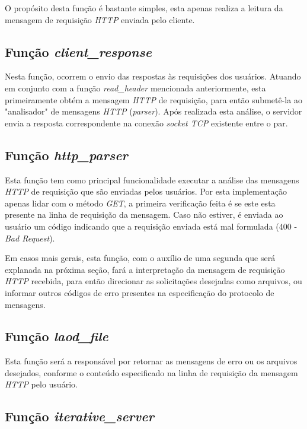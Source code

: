 \documentclass[a4paper, 12pt]{article}
\begin{document}
O propósito desta função é bastante simples, esta apenas realiza a leitura da mensagem de requisição \emph{HTTP} enviada pelo cliente.

\subsection{Função \emph{client\_response}}

Nesta função, ocorrem o envio das respostas às requisições dos usuários. Atuando em conjunto com a função \emph{read\_header} mencionada anteriormente, esta primeiramente obtém a mensagem \emph{HTTP} de requisição, para então submetê-la ao "analisador" de mensagens \emph{HTTP} (\emph{parser}). Após realizada esta análise, o servidor envia a resposta correspondente na conexão \emph{socket TCP} existente entre o par. 

\subsection{Função \emph{http\_parser}}

Esta função tem como principal funcionalidade executar a análise das mensagens \emph{HTTP} de requisição que são enviadas pelos usuários. Por esta implementação apenas lidar com o método \emph{GET}, a primeira verificação feita é se este esta presente na linha de requisição da mensagem. Caso não estiver, é enviada ao usuário um código indicando que a requisição enviada está mal formulada (400 - \emph{Bad Request}).

Em casos mais gerais, esta função, com o auxílio de uma segunda que será explanada na próxima seção, fará a interpretação da mensagem de requisição \emph{HTTP} recebida, para então direcionar as solicitações desejadas como arquivos, ou informar outros códigos de erro presentes na especificação do protocolo de mensagens.

\subsection{Função \emph{laod\_file}}

Esta função será a responsável por retornar as mensagens de erro ou os arquivos desejados, conforme o conteúdo especificado na linha de requisição da mensagem \emph{HTTP} pelo usuário.

\subsection{Função \emph{iterative\_server}}
\end{document}
